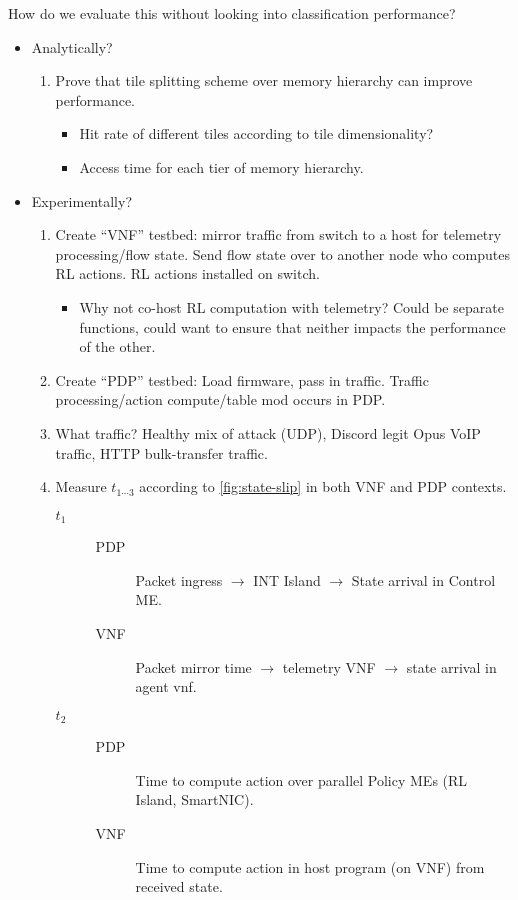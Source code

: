 \documentclass[sigconf,natbib=false]{acmart}
\begin{document}
How do we evaluate this without looking into classification performance?
\begin{itemize}
	\item Analytically?
	\begin{enumerate}
		\item Prove that tile splitting scheme over memory hierarchy can improve performance.
		\begin{itemize}
			\item Hit rate of different tiles according to tile dimensionality?
			\item Access time for each tier of memory hierarchy.
		\end{itemize}
	\end{enumerate}
	\item Experimentally?
	\begin{enumerate}
		\item Create ``VNF'' testbed: mirror traffic from switch to a host for telemetry processing/flow state. Send flow state over to another node who computes RL actions. RL actions installed on switch.
		\begin{itemize}
			\item Why not co-host RL computation with telemetry? Could be separate functions, could want to ensure that neither impacts the performance of the other.
		\end{itemize}
		\item Create ``PDP'' testbed: Load firmware, pass in traffic. Traffic processing/action compute/table mod occurs in PDP.
		\item What traffic? Healthy mix of attack (UDP), Discord legit Opus VoIP traffic, HTTP bulk-transfer traffic.
		\item Measure $t_{1 \cdots 3}$ according to \cref{fig:state-slip} in both VNF and PDP contexts.
		\begin{description}
			\item[$t_1$]
			\begin{description}
				\item[PDP] Packet ingress $\rightarrow$ INT Island $\rightarrow$ State arrival in Control ME.
				\item[VNF] Packet mirror time $\rightarrow$ telemetry VNF $\rightarrow$ state arrival in agent vnf.
			\end{description}
		
			\item[$t_2$]
			\begin{description}
				\item[PDP] Time to compute action over parallel Policy MEs (RL Island, SmartNIC).
				\item[VNF] Time to compute action in host program (on VNF) from received state.
			\end{description}
		

\end{description}
\end{enumerate}
\end{itemize}
\end{document}

